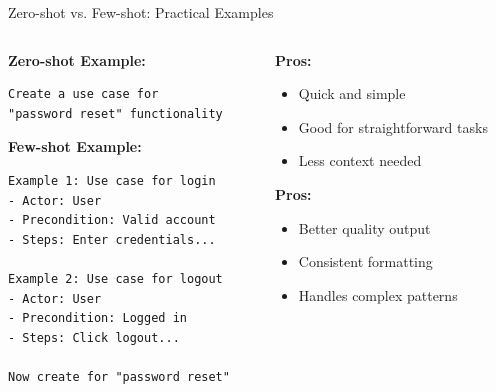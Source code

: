 \documentclass{beamer}
\begin{document}
\begin{frame}[fragile,t]{Zero-shot vs. Few-shot: Practical Examples}
    \begin{columns}
        \begin{column}{0.5\textwidth}
            \textbf{Zero-shot Example:}
            \begin{lstlisting}[style=code]
Create a use case for 
"password reset" functionality
            \end{lstlisting}
            \vspace{.7cm}
            
            \textbf{Few-shot Example:}
            \begin{lstlisting}[style=code]
Example 1: Use case for login
- Actor: User
- Precondition: Valid account
- Steps: Enter credentials...

Example 2: Use case for logout
- Actor: User
- Precondition: Logged in
- Steps: Click logout...

Now create for "password reset"
            \end{lstlisting}
        \end{column}
        \begin{column}{0.5\textwidth}
            
            \textbf{Pros:}
            \begin{itemize}
                \item Quick and simple
                \item Good for straightforward tasks
                \item Less context needed
            \end{itemize}
            \textbf{Pros:}
            \begin{itemize}
                \item Better quality output
                \item Consistent formatting
                \item Handles complex patterns
            \end{itemize}
        \end{column}
    \end{columns}
\end{frame}
\end{document}
